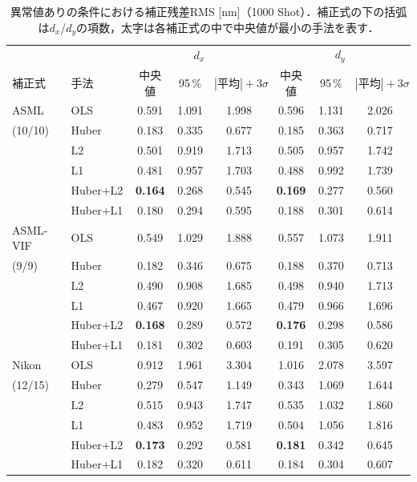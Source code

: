\documentclass[11pt,a4paper]{ltjsarticle}
\begin{document}
\begin{table}[tb]
  \centering
  \caption{異常値ありの条件における補正残差RMS [nm]（1000 Shot）．補正式の下の括弧は$d_x$/$d_y$の項数，太字は各補正式の中で中央値が最小の手法を表す．}
  \label{tab:summary}
  \small
  \begin{tabular}{llcccccc}
    \toprule
     & & \multicolumn{3}{c}{$d_x$} & \multicolumn{3}{c}{$d_y$} \\
    \cmidrule(lr){3-5}\cmidrule(lr){6-8}
    補正式 & 手法 & 中央値 & 95\,\% & $|\text{平均}|+3\sigma$ & 中央値 & 95\,\% & $|\text{平均}|+3\sigma$ \\
    \midrule
    ASML & OLS & 0.591 & 1.091 & 1.998 & 0.596 & 1.131 & 2.026 \\
    (10/10) & Huber & 0.183 & 0.335 & 0.677 & 0.185 & 0.363 & 0.717 \\
     & L2 & 0.501 & 0.919 & 1.713 & 0.505 & 0.957 & 1.742 \\
     & L1 & 0.481 & 0.957 & 1.703 & 0.488 & 0.992 & 1.739 \\
     & Huber+L2 & \textbf{0.164} & 0.268 & 0.545 & \textbf{0.169} & 0.277 & 0.560 \\
     & Huber+L1 & 0.180 & 0.294 & 0.595 & 0.188 & 0.301 & 0.614 \\
    \midrule
    ASML-VIF & OLS & 0.549 & 1.029 & 1.888 & 0.557 & 1.073 & 1.911 \\
    (9/9) & Huber & 0.182 & 0.346 & 0.675 & 0.188 & 0.370 & 0.713 \\
     & L2 & 0.490 & 0.908 & 1.685 & 0.498 & 0.940 & 1.713 \\
     & L1 & 0.467 & 0.920 & 1.665 & 0.479 & 0.966 & 1.696 \\
     & Huber+L2 & \textbf{0.168} & 0.289 & 0.572 & \textbf{0.176} & 0.298 & 0.586 \\
     & Huber+L1 & 0.181 & 0.302 & 0.603 & 0.191 & 0.305 & 0.620 \\
    \midrule
    Nikon & OLS & 0.912 & 1.961 & 3.304 & 1.016 & 2.078 & 3.597 \\
    (12/15) & Huber & 0.279 & 0.547 & 1.149 & 0.343 & 1.069 & 1.644 \\
     & L2 & 0.515 & 0.943 & 1.747 & 0.535 & 1.032 & 1.860 \\
     & L1 & 0.483 & 0.952 & 1.719 & 0.504 & 1.056 & 1.816 \\
     & Huber+L2 & \textbf{0.173} & 0.292 & 0.581 & \textbf{0.181} & 0.342 & 0.645 \\
     & Huber+L1 & 0.182 & 0.320 & 0.611 & 0.184 & 0.304 & 0.607 \\

\end{tabular}
\end{table}
\end{document}
